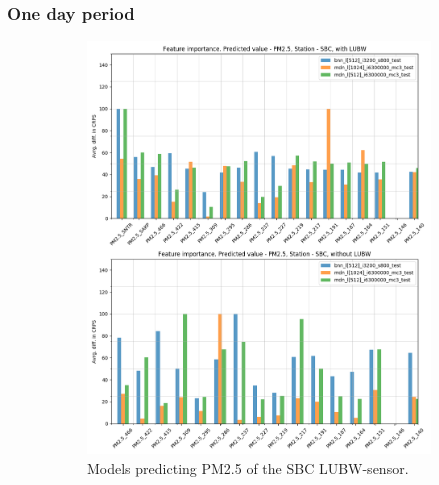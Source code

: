 \documentclass[12pt,a4paper,twoside]{scrartcl}
\numberwithin{equation}{section}
\begin{document}
\subsubsection{One day period}
\begin{figure}[H]
  \centering
  \begin{subfigure}[t]{0.49\textwidth}
    \includegraphics[width=\textwidth,height=1.2\textwidth]{figures/figs_1d/feature_importance_CRPS_SBC_P2}%
    \caption{Models predicting PM2.5 of the SBC LUBW-sensor.}
  \end{subfigure}
  \begin{subfigure}[t]{0.49\textwidth}

\end{subfigure}
\end{figure}
\end{document}
